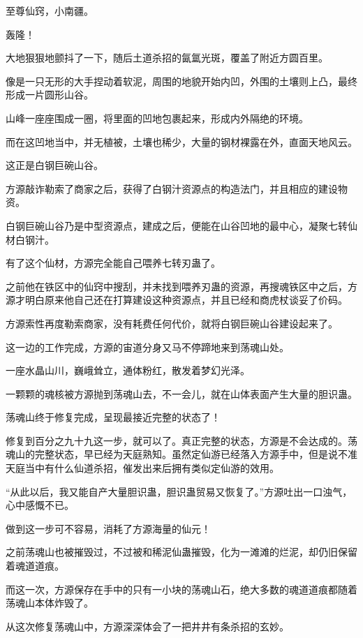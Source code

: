 
\begin{this_body}

至尊仙窍，小南疆。

轰隆！

大地狠狠地颤抖了一下，随后土道杀招的氤氲光斑，覆盖了附近方圆百里。

像是一只无形的大手捏动着软泥，周围的地貌开始内凹，外围的土壤则上凸，最终形成一片圆形山谷。

山峰一座座围成一圈，将里面的凹地包裹起来，形成内外隔绝的环境。

而在这凹地当中，并无植被，土壤也稀少，大量的钢材裸露在外，直面天地风云。

这正是白钢巨碗山谷。

方源敲诈勒索了商家之后，获得了白钢汁资源点的构造法门，并且相应的建设物资。

白钢巨碗山谷乃是中型资源点，建成之后，便能在山谷凹地的最中心，凝聚七转仙材白钢汁。

有了这个仙材，方源完全能自己喂养七转刃蛊了。

之前他在铁区中的仙窍中搜刮，并未找到喂养刃蛊的资源，再搜魂铁区中之后，方源才明白原来他自己还在打算建设这种资源点，并且已经和商虎杖谈妥了价码。

方源索性再度勒索商家，没有耗费任何代价，就将白钢巨碗山谷建设起来了。

这一边的工作完成，方源的宙道分身又马不停蹄地来到荡魂山处。

一座水晶山川，巍峨耸立，通体粉红，散发着梦幻光泽。

一颗颗的魂核被方源抛到荡魂山去，不一会儿，就在山体表面产生大量的胆识蛊。

荡魂山终于修复完成，呈现最接近完整的状态了！

修复到百分之九十九这一步，就可以了。真正完整的状态，方源是不会达成的。荡魂山的完整状态，早已经为天庭熟知。虽然定仙游已经落入方源手中，但是说不准天庭当中有什么仙道杀招，催发出来后拥有类似定仙游的效用。

“从此以后，我又能自产大量胆识蛊，胆识蛊贸易又恢复了。”方源吐出一口浊气，心中感慨不已。

做到这一步可不容易，消耗了方源海量的仙元！

之前荡魂山也被摧毁过，不过被和稀泥仙蛊摧毁，化为一滩滩的烂泥，却仍旧保留着魂道道痕。

而这一次，方源保存在手中的只有一小块的荡魂山石，绝大多数的魂道道痕都随着荡魂山本体炸毁了。

从这次修复荡魂山中，方源深深体会了一把井井有条杀招的玄妙。


\end{this_body}
